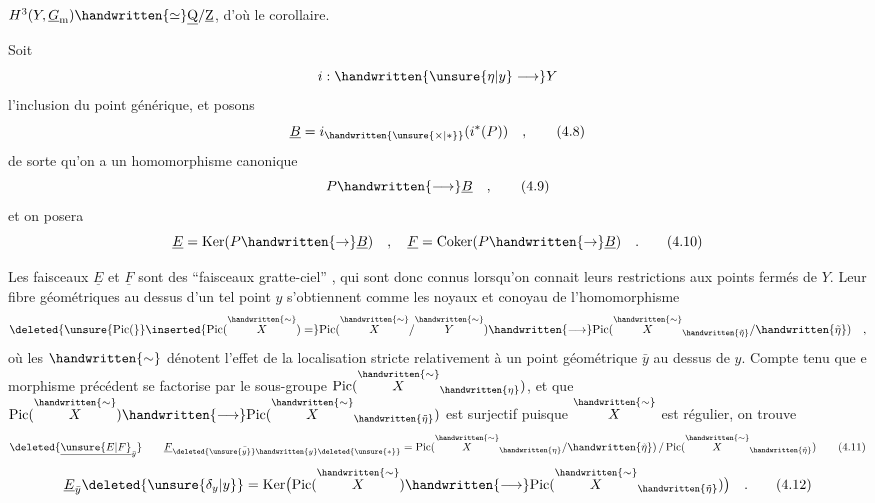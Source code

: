 $H^{3}(Y,\underline G_{\mathrm m})\handwritten{\simeq}\underline{\mathrm Q}/\underline{\mathrm Z}$, d'où le corollaire.

Soit 
\[
  i:\handwritten{\unsure{\eta|y}\longrightarrow}Y
\]
l'inclusion du point générique, et posons
\[
  \underline B=i_{\handwritten{\unsure{\times|\ast}}}(i^{*}(P)) \quad , \tag*{(4.8)}
\]
de sorte qu'on a un homomorphisme canonique
\[
  P\handwritten{\longrightarrow}\underline B \quad , \tag*{(4.9)}
\]
et on posera
\[
  \underline E=\operatorname{Ker}(P\handwritten{\to}\underline B)
  \quad ,\quad \underline F=\operatorname{Coker}(P\handwritten{\to}\underline B)\quad . \tag*{(4.10)}
\]

Les faisceaux $\underline E$ et $\underline F$ sont des ``faisceaux gratte-ciel'' , qui sont donc connus lorsqu'on connait leurs restrictions aux points fermés de $Y$. Leur fibre géométriques au dessus d'un tel point $y$ s'obtiennent comme les noyaux et conoyau de l'homomorphisme
\[
  \deleted{\unsure{\mathrm{Pic}(}}\inserted{\mathrm{Pic}(\overset{\handwritten{\sim}}{X})=}
  \mathrm{Pic}(\overset{\handwritten{\sim}}{X}/\overset{\handwritten{\sim}}{Y})\handwritten{\longrightarrow}
  \mathrm{Pic}(\overset{\handwritten{\sim}}{X}_{\handwritten{\tilde\eta}}/\handwritten{\tilde\eta})\quad ,
\]
où les $\handwritten{\sim}$ dénotent l'effet de la localisation stricte relativement à un point géométrique $\bar y$ au dessus de $y$.  Compte tenu que e morphisme précédent se factorise par le sous-groupe $\mathrm{Pic}(\overset{\handwritten{\sim}}{X}_{\handwritten{\eta}})$, et que $\mathrm{Pic}(\overset{\handwritten{\sim}}{X})\handwritten{\longrightarrow}\mathrm{Pic}(\overset{\handwritten{\sim}}{X}_{\handwritten{\tilde\eta}})$ est surjectif puisque $\overset{\handwritten{\sim}}{X}$ est régulier, on trouve
\[
  \deleted{\underline{\unsure{E|F}}_{\bar y}}\qquad
  \underline F_{\bar{\deleted{\unsure{y}}\handwritten{y}}\deleted{\unsure{*}}}=
  \mathrm{Pic}(\overset{\handwritten{\sim}}{X}_{\handwritten{\eta}}/\handwritten{\tilde\eta})\,/\,\mathrm{Pic}(\overset{\handwritten{\sim}}{X}_{\handwritten{\tilde\eta}}) \tag*{(4.11)}
\]
\[
  \underline E_{\bar y}\deleted{\unsure{\delta_y|y}}=
  \operatorname{Ker}\bigl(\mathrm{Pic}(\overset{\handwritten{\sim}}{X})\handwritten{\longrightarrow}\mathrm{Pic}(\overset{\handwritten{\sim}}{X}_{\handwritten{\tilde\eta}})\bigr)\quad . \tag*{(4.12)}
\]
